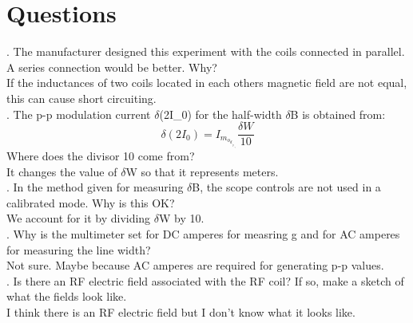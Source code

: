 \documentclass[12pt]{article}
\begin{document}
\section{Questions}
\indent {}. The manufacturer designed this experiment with the coils connected in parallel. A series connection would be better. Why? \\
\indent If the inductances of two coils located in each others magnetic field are not equal, this can cause short circuiting. \\
. The p-p modulation current $\delta$(2I_0) for the half-width $\delta$B is obtained from:
\[\delta (2I_0) = I_m_o_d_,_p_-_p \frac{\delta W}{10} \]
\indent Where does the divisor 10 come from? \\
\indent It changes the value of $\delta$W so that it represents meters. \\
. In the method given for measuring $\delta$B, the scope controls are not used in a calibrated mode. Why is this OK? \\
\indent We account for it by dividing $\delta$W by 10. \\
. Why is the multimeter set for DC amperes for measring g and for AC amperes for measuring the line width? \\
\indent Not sure. Maybe because AC amperes are required for generating p-p values. \\
. Is there an RF electric field associated with the RF coil? If so, make a sketch of what the fields look like. \\
\indent I think there is an RF electric field but I don't know what it looks like.
\end{document}
